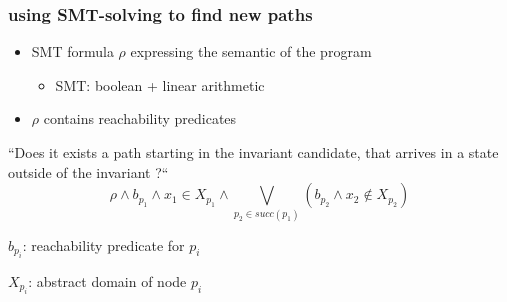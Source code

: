 \documentclass{beamer}
\begin{document}
\begin{frame}
\begin{columns}
\begin{column}{5.5cm}
{
}
\end{column}
\end{columns}
\end{frame}

\begin{frame}
  \frametitle{using SMT-solving to find new paths}
\begin{itemize}
\item SMT formula $\rho$ expressing the semantic of the program
\begin{itemize}
\item SMT: boolean + linear arithmetic
\end{itemize}
\item $\rho$ contains reachability predicates
\end{itemize}
\bigskip
``Does it exists a path starting in the invariant candidate, that arrives in a
state outside of the invariant {?}`` 
\bigskip
$$\rho  \wedge b_{p_1} \wedge x_1 \in X_{p_1} \wedge \bigvee_{p_2 \in succ(p_1)}
 (b_{p_2} \wedge x_2 \notin X_{p_2})$$

\footnotesize{
$b_{p_i}$: reachability predicate for $p_i$

$X_{p_i}$: abstract domain of node $p_i$
}
\end{frame}
\end{document}
